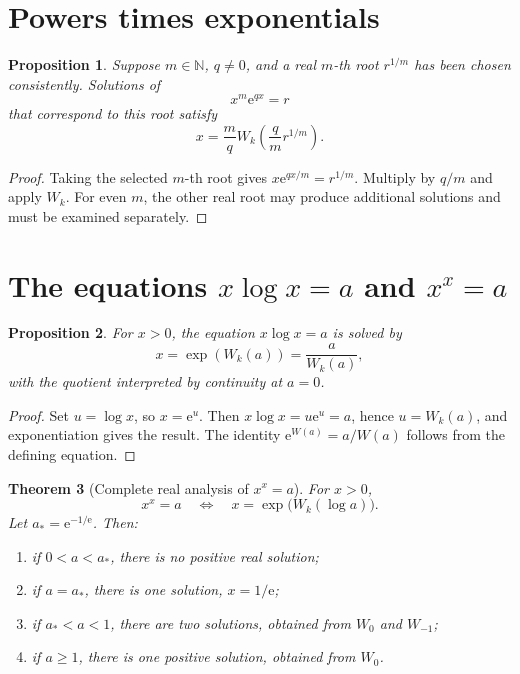 \documentclass[11pt,openany]{book}
\newcommand{\e}{\mathrm{e}}
\theoremstyle{plain}
\newtheorem{theorem}{Theorem}[chapter]
\newtheorem{proposition}[theorem]{Proposition}
\theoremstyle{definition}
\theoremstyle{remark}
\begin{document}
\section{Powers times exponentials}

\begin{proposition}\label{prop:powerexp}
Suppose \(m\in\mathbb N\), \(q\ne0\), and a real \(m\)-th root \(r^{1/m}\) has been
chosen consistently.  Solutions of
\[
       x^m\e^{qx}=r
\]
that correspond to this root satisfy
\[
       x=\frac mq W_k\!\left(\frac qm r^{1/m}\right).
\]
\end{proposition}

\begin{proof}
Taking the selected \(m\)-th root gives
\(x\e^{qx/m}=r^{1/m}\).  Multiply by \(q/m\) and apply \(W_k\).
For even \(m\), the other real root may produce additional solutions and must be
examined separately.
\end{proof}

\section{The equations \texorpdfstring{\(x\log x=a\)}{x log x=a} and
\texorpdfstring{\(x^x=a\)}{x to the x = a}}

\begin{proposition}\label{prop:xlogx}
For \(x>0\), the equation \(x\log x=a\) is solved by
\[
       x=\exp(W_k(a))=\frac{a}{W_k(a)},
\]
with the quotient interpreted by continuity at \(a=0\).
\end{proposition}

\begin{proof}
Set \(u=\log x\), so \(x=\e^u\).  Then
\(x\log x=u\e^u=a\), hence \(u=W_k(a)\), and exponentiation gives the result.
The identity \(\e^{W(a)}=a/W(a)\) follows from the defining equation.
\end{proof}

\begin{theorem}[Complete real analysis of \(x^x=a\)]\label{thm:xx}
For \(x>0\),
\[
       x^x=a
       \quad\Longleftrightarrow\quad
       x=\exp\bigl(W_k(\log a)\bigr).
\]
Let \(a_*=\e^{-1/\e}\).  Then:
\begin{enumerate}[label=(\alph*)]
\item if \(0<a<a_*\), there is no positive real solution;
\item if \(a=a_*\), there is one solution, \(x=1/\e\);
\item if \(a_*<a<1\), there are two solutions, obtained from \(W_0\) and
      \(W_{-1}\);
\item if \(a\ge1\), there is one positive solution, obtained from \(W_0\).
\end{enumerate}
\end{theorem}
\end{document}

